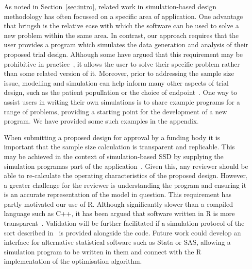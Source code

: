 \documentclass{article} %
\begin{document}
As noted in Section~\ref{sec:intro}, related work in simulation-based design methodology has often focussed on a specific area of application. One advantage that bringsh is the relative ease with which the software can be used to solve a new problem within the same area. In contrast, our approach requires that the user provides a program which simulates the data generation and analysis of their proposed trial design. Although some have argued that this requirement may be prohibitive in practice~\cite{Kontopantelis2016}, it allows the user to solve their specific problem rather than some related version of it. Moreover, prior to addressing the sample size issue, modelling and simulation can help inform many other aspects of trial design, such as the patient popullation or the choice of endpoint~\cite{Smith2010}. One way to assist users in writing their own simulations is to share example programs for a range of problems, providing a starting point for the development of a new program. We have provided some such examples in the appendix.


When submitting a proposed design for approval by a funding body it is important that the sample size calculation is transparent and replicable. This may be achieved in the context of simulation-based SSD by supplying the simulation programas part of the application~\cite{Hooper2013}. Given this, any reviewer should be able to re-calculate the operating characteristics of the proposed design. However, a greater challenge for the reviewer is understanding the program and ensuring it is an accurate representation of the model in question. This requirement has partly motivated our use of R. Although significantly slower than a compiled language such as C++, it has been argued that software written in R is more transparent~\cite{Smith2010}. Validation will be further facilitated if a simulation protocol of the sort described in~\cite{Burton2006} is provided alongside the code. Future work could develop an interface for alternative statistical software such as Stata or SAS, allowing a simulation program to be written in them and connect with the R implementation of the optimisation algorithm.
\end{document}
